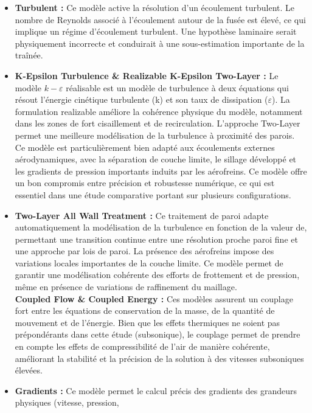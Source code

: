 \begin{itemize}
    \item \textbf{Turbulent : } Ce modèle active la résolution d’un écoulement turbulent. Le nombre de Reynolds associé à
    l’écoulement autour de la fusée est élevé, ce qui implique un régime d’écoulement turbulent. Une hypothèse laminaire serait
    physiquement incorrecte et conduirait à une sous-estimation importante de la traînée.\\
    \item \textbf{K-Epsilon Turbulence \& Realizable K-Epsilon Two-Layer : } Le modèle $k-\varepsilon$ réalisable est un modèle de
    turbulence à deux équations qui résout l’énergie cinétique turbulente (k) et son taux de dissipation ($\varepsilon$). La
    formulation realizable améliore la cohérence physique du modèle, notamment dans les zones de fort cisaillement et de
    recirculation. L’approche Two-Layer permet une meilleure modélisation de la turbulence à proximité des parois. Ce modèle est
    particulièrement bien adapté aux écoulements externes aérodynamiques, avec la séparation de couche limite, le sillage
    développé et les gradients de pression importants induits par les aérofreins. Ce modèle offre un bon compromis entre
    précision et robustesse numérique, ce qui est essentiel dans une étude comparative portant sur plusieurs configurations.\\
    \item \textbf{Two-Layer All  Wall Treatment : } Ce traitement de paroi adapte automatiquement la modélisation de la turbulence
    en fonction de la valeur de, permettant une transition continue entre une résolution proche paroi fine et une approche par
    lois de paroi. La présence des aérofreins impose des variations locales importantes de la couche limite. Ce modèle permet de
    garantir une modélisation cohérente des efforts de frottement et de pression, même en présence de variations de raffinement
    du maillage.\\
    \textbf{Coupled Flow \& Coupled Energy : } Ces modèles assurent un couplage fort entre les équations de conservation de la
    masse, de la quantité de mouvement et de l’énergie. Bien que les effets thermiques ne soient pas prépondérants dans cette
    étude (subsonique), le couplage permet de prendre en compte les effets de compressibilité de l’air de manière cohérente,
    améliorant la stabilité et la précision de la solution à des vitesses subsoniques élevées.\\
    \item \textbf{Gradients : } Ce modèle permet le calcul précis des gradients des grandeurs physiques (vitesse, pression,

\end{itemize}
